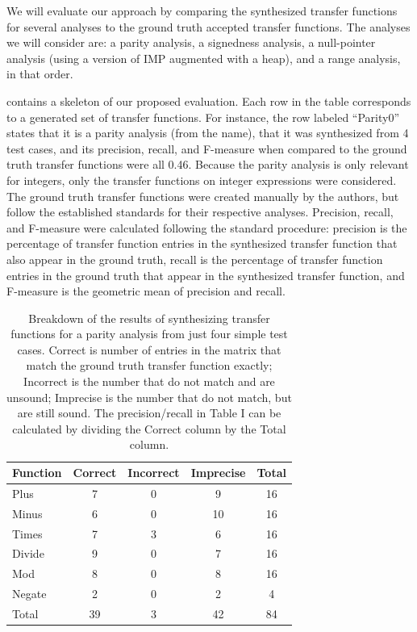 \documentclass[10pt,conference]{IEEEtran}
\begin{document}
We will evaluate our approach by comparing the synthesized transfer
functions for several analyses to the ground truth accepted transfer
functions. The analyses we will consider are: a parity analysis,
a signedness analysis, a null-pointer analysis (using a version of
IMP augmented with a heap), and a range analysis, in that order.

 contains a skeleton of our proposed evaluation.
Each row in the table corresponds to a generated set of transfer functions.
For instance,
the row labeled ``Parity0'' states that it is a parity analysis
(from the name), that it was synthesized from 4 test cases,
and its precision, recall, and F-measure when compared to the ground
truth transfer functions were all 0.46. Because the parity analysis is only
relevant for integers, only the transfer functions on integer expressions
were considered.
The ground truth transfer functions were created manually by the authors,
but follow the established standards for their respective analyses.
Precision, recall, and F-measure were calculated following the standard
procedure: precision is the percentage of transfer function entries
in the synthesized transfer function that also appear in the ground truth,
recall is the percentage of transfer function entries in the ground truth
that appear in the synthesized transfer function, and F-measure is the
geometric mean of precision and recall.

\begin{table}
\centering
 \begin{tabular}{l c c c c }
  
  Function & Correct & Incorrect & Imprecise & Total\\ 
  \midrule
  Plus & 7 & 0 & 9 & 16 \\
  Minus & 6 & 0 & 10 & 16 \\
  Times & 7 & 3 & 6 & 16 \\
  Divide & 9 & 0 & 7 & 16 \\
  Mod & 8 & 0 & 8 & 16 \\
  Negate & 2 & 0 & 2 & 4 \\
  \midrule
  Total & 39 & 3 & 42 & 84 \\
 \end{tabular}
 \caption{Breakdown of the results of synthesizing transfer functions
 for a parity analysis from just four simple test cases. Correct is number
 of entries in the matrix that match the ground truth transfer function
 exactly; Incorrect is the number that do not match and are unsound;
 Imprecise is the number that do not match, but are still sound. The
 precision/recall in Table I can be calculated by dividing
 the Correct column by the Total column.}
 \label{tab-parity0}
\end{table}
\end{document}
